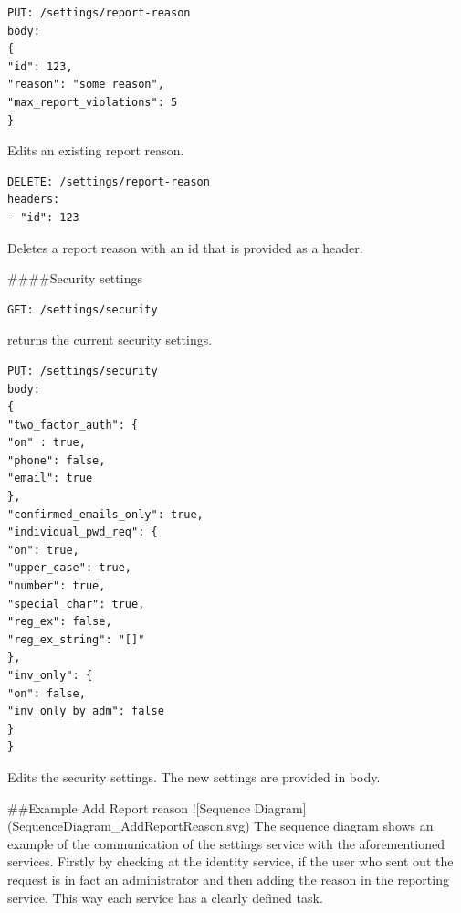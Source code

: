 \begin{verbatim}
PUT: /settings/report-reason
body:
{
"id": 123,
"reason": "some reason",
"max_report_violations": 5
}
\end{verbatim}
Edits an existing report reason.


\begin{verbatim}
DELETE: /settings/report-reason
headers:
- "id": 123
\end{verbatim}

Deletes a report reason with an id that is provided as a header.

####Security settings
\begin{verbatim}
GET: /settings/security
\end{verbatim}

returns the current security settings.

\begin{verbatim}
PUT: /settings/security
body:
{
"two_factor_auth": {
"on" : true,
"phone": false,
"email": true
},
"confirmed_emails_only": true,
"individual_pwd_req": {
"on": true,
"upper_case": true,
"number": true,
"special_char": true,
"reg_ex": false,
"reg_ex_string": "[]"
},
"inv_only": {
"on": false,
"inv_only_by_adm": false
}
}
\end{verbatim}
Edits the security settings. The new settings are provided in body.

##Example Add Report reason
![Sequence Diagram](SequenceDiagram_AddReportReason.svg)
The sequence diagram shows an example of the communication of the settings service with the aforementioned services.
Firstly by checking at the identity service, if the user who sent out the request is in fact an administrator and then adding the reason in the reporting service.
This way each service has a clearly defined task.

